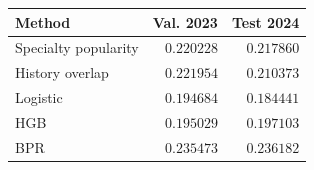 \begin{tabularx}{\linewidth}{@{}Xrr@{}}
\toprule
Method & Val. 2023 & Test 2024 \\
\midrule
Specialty popularity & $0.220228$ & $0.217860$ \\
History overlap & $0.221954$ & $0.210373$ \\
Logistic & $0.194684$ & $0.184441$ \\
HGB & $0.195029$ & $0.197103$ \\
BPR & $0.235473$ & $0.236182$ \\
\bottomrule
\end{tabularx}
